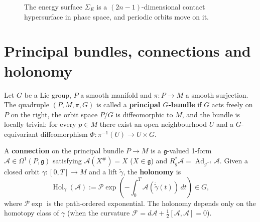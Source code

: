 \begin{figure}[htbp]
\centering
{}
\caption{The energy surface $\Sigma_E$ is a $(2n-1)$-dimensional contact hypersurface in phase space, and periodic orbits move on it.}
\label{fig:energy_surface_periodic}
\end{figure}

\section{Principal bundles, connections and holonomy}\label{sec:principal_bundle_holonomy}

\begin{definition}\label{def:principal_bundle}
Let $G$ be a Lie group, $P$ a smooth manifold and $\pi:P\to M$ a smooth surjection. The quadruple $(P,M,\pi,G)$ is called a \textbf{principal $G$-bundle} if $G$ acts freely on $P$ on the right, the orbit space $P/G$ is diffeomorphic to $M$, and the bundle is locally trivial: for every $p\in M$ there exist an open neighbourhood $U$ and a $G$-equivariant diffeomorphism $\Phi:\pi^{-1}(U)\to U\times G$.
\end{definition}

\begin{definition}\label{def:connection_holonomy}
A \textbf{connection} on the principal bundle $P\to M$ is a $\mathfrak{g}$-valued 1-form $\mathcal{A}\in\Omega^1(P,\mathfrak{g})$ satisfying $\mathcal{A}(X^\#)=X$ ($X\in\mathfrak{g}$) and $R_g^*\mathcal{A}=\operatorname{Ad}_{g^{-1}}\mathcal{A}$. Given a closed orbit $\gamma:[0,T]\to M$ and a lift $\tilde\gamma$, the \textbf{holonomy} is
\[
\operatorname{Hol}_\gamma(\mathcal{A}):=\mathcal{P}\exp\!\left(-\int_0^T\mathcal{A}(\dot{\tilde\gamma}(t))\,dt\right)\in G,
\]
where $\mathcal{P}\exp$ is the path-ordered exponential. The holonomy depends only on the homotopy class of $\gamma$ (when the curvature $\mathcal{F}=d\mathcal{A}+\tfrac12[\mathcal{A},\mathcal{A}]=0$).
\end{definition}

